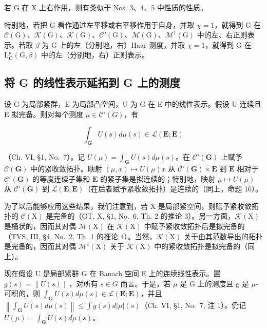 若 G 在 X 上右作用，则有类似于 Nos. 3、4、5 中性质的性质。

特别地，若把 G 看作通过左平移或右平移作用于自身，并取 \(\chi = 1\)，就得到 G 在 \(\mathcal{C}(\mathrm{G})\)、\(\mathcal{K}(\mathrm{G})\)、\(\overline{\mathcal{K}(\mathrm{G})}\)、\(\mathcal{C}'(\mathrm{G})\)、\(\mathcal{M}(\mathrm{G})\)、\(\mathcal{M}^{1}(\mathrm{G})\) 中的左、右正则表示。若取 \(\beta\) 为 G 上的左（分别地，右）Haar 测度，并取 \(\chi = 1\)，就得到 G 在 \(\mathrm{L}_{\mathbf{C}}^{p}(\mathrm{G}, \beta)\) 中的左（分别地，右）正则表示。

\subsection{将 G 的线性表示延拓到 G 上的测度}

设 G 为局部紧群，E 为局部凸空间，U 为 G 在 E 中的线性表示。假设 U 连续且 E 拟完备。则对每个测度 \(\mu \in \mathcal{C}'(G)\)，有

\[
\int_ {\mathbf {G}} U (s) d \mu (s) \in \mathcal {L} (\mathbf {E}; \mathbf {E})
\]

（Ch. VI, §1, No.~7）。记 \(U(\mu) = \int_{\mathbf{G}} U(s) d\mu(s)\)。在 \(\mathcal{C}'(\mathbf{G})\) 上赋予 \(\mathcal{C}(\mathbf{G})\) 中的紧收敛拓扑。映射 \((\mu, x) \mapsto U(\mu)x\) 从 \(\mathcal{C}'(\mathbf{G}) \times \mathbf{E}\) 到 \(\mathbf{E}\) 相对于 \(\mathcal{C}'(\mathbf{G})\) 的等度连续子集和 \(\mathbf{E}\) 的紧子集是拟连续的；特别地，映射 \(\mu \mapsto U(\mu)\) 从 \(\mathcal{C}'(\mathbf{G})\) 到 \(\mathcal{L}(\mathbf{E}; \mathbf{E})\)（在后者赋予紧收敛拓扑）是连续的（同上，命题 16）。

为了以后能够应用这些结果，我们注意到，若 X 是局部紧空间，则赋予紧收敛拓扑的 \(\mathcal{C}(\mathrm{X})\) 是完备的（GT, X, §1, No.~6, Th. 2 的推论 3）。另一方面，\(\mathcal{K}(\mathrm{X})\) 是桶状的，因而其对偶 \(\mathcal{M}(\mathrm{X})\) 在 \(\mathcal{K}(\mathrm{X})\) 中赋予紧收敛拓扑后是拟完备的（TVS, III, §4, No.~2, Th. 1 的推论 4）。当然，\(\overline{\mathcal{K}(\mathrm{X})}\) 关于由其范数导出的拓扑是完备的，因而其对偶 \(\mathcal{M}^{1}(\mathrm{X})\) 关于 \(\overline{\mathcal{K}(\mathrm{X})}\) 中的紧收敛拓扑是拟完备的（同上）。

现在假设 U 是局部紧群 G 在 Banach 空间 E 上的连续线性表示。置 \(g(s) = \|U(s)\|\)，对所有 \(s \in G\) 而言。于是，若 \(\mu\) 是 G 上的测度且 g 是 \(\mu\)-可积的，则 \(\int_{\mathbf{G}} U(s) d\mu(s) \in \mathcal{L}(\mathbf{E}; \mathbf{E})\)，并且 \(\left\|\int_{\mathbf{G}} U(s) d\mu(s)\right\| \leqslant \int g(s) d|\mu|(s)\)（Ch. VI, §1, No.~7, 注 1）。仍记 \(U(\mu) = \int_{\mathbf{G}} U(s) d\mu(s)\)。

